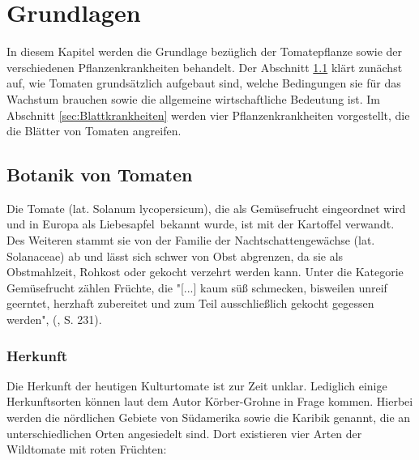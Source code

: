 \chapter{Grundlagen}
\label{chapter:grundlagen}


In diesem Kapitel werden die Grundlage bezüglich der Tomatepflanze sowie der verschiedenen Pflanzenkrankheiten behandelt. Der Abschnitt \ref{botanik} klärt zunächst auf, wie Tomaten grundsätzlich aufgebaut sind, welche Bedingungen sie für das Wachstum brauchen sowie die allgemeine wirtschaftliche Bedeutung ist. Im Abschnitt \ref{sec:Blattkrankheiten} werden vier Pflanzenkrankheiten vorgestellt, die die Blätter von Tomaten angreifen. 

\section{Botanik von Tomaten}
\label{botanik}

Die Tomate (lat. Solanum lycopersicum), die als Gemüsefrucht eingeordnet wird und in Europa als \glqq Liebesapfel\grqq~bekannt wurde, ist mit der Kartoffel verwandt\cite{nutzInDE}. Des Weiteren stammt sie von der Familie der Nachtschattengewächse (lat. Solanaceae) ab und lässt sich schwer von Obst abgrenzen, da sie als Obstmahlzeit, Rohkost oder gekocht verzehrt werden kann. Unter die Kategorie Gemüsefrucht zählen Früchte, die "[...] kaum süß schmecken, bisweilen unreif geerntet, herzhaft zubereitet und zum Teil ausschließlich gekocht gegessen werden", (\cite{nutzpflanzen}, S. 231). 


\subsection{Herkunft}

Die Herkunft der heutigen Kulturtomate ist zur Zeit unklar. Lediglich einige Herkunftsorten können laut dem Autor Körber-Grohne\cite{nutzInDE} in Frage kommen. Hierbei werden die nördlichen Gebiete von Südamerika sowie die Karibik genannt, die an unterschiedlichen Orten angesiedelt sind. Dort existieren vier Arten der Wildtomate mit roten Früchten:


